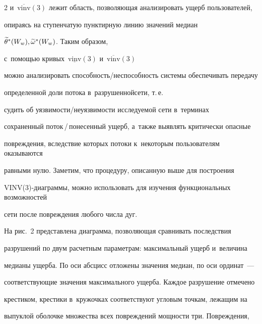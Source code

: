 \begin{multicols}{2}
и~$\overline {\mathrm{vinv}}(3)$ лежит область, поз\-во\-ля\-ющая анализировать  ущерб пользователей, 


опираясь на ступенчатую пунктирную линию значений медиан 


$\widetilde {\theta}^*(W_w), \widetilde {\omega}^*(W_w)$. Таким образом, 


с~по\-мощью кривых~$\underline {\mathrm{vinv}}(3)$ и~$\overline {\mathrm{vinv}}(3)$ 


можно анализировать спо\-соб\-ность/не\-спо\-соб\-ность системы обеспечивать передачу 


определенной доли потока в~разрушенной\linebreak сети, т.\,е.\


 судить об уяз\-ви\-мости/не\-уяз\-ви\-мости исследуемой сети в~терминах 


 сохраненный по\-ток\,/\,по\-не\-сен\-ный ущерб, а~также выявлять критически  опасные 


 повреждения, вследствие которых  потоки к~некоторым пользователям оказываются  


 равными нулю. Заметим, что процедуру, описанную выше для построения 


 VINV(3)-диаграммы, можно использовать для изучения функциональных возможностей 


 сети после повреждения любого числа дуг.


 {


 


 }


 














На рис.~2 представлена диаграмма, поз\-во\-ля\-ющая сравнивать последствия 


разрушений по двум расчетным  параметрам:  максимальный ущерб  и~величина  


медианы ущерба. По оси абсцисс отложены значения медиан, по оси ординат~--- 


соответствующие значения максимального ущерба. Каждое разрушение  отмечено   


крестиком,  крестики в~кружочках соответствуют  угловым точкам, лежащим на 


выпуклой оболочке множества всех повреждений мощности три. Повреждения, 



\end{multicols}
